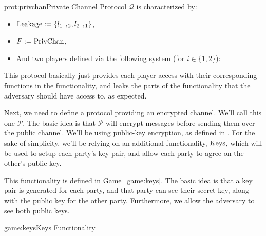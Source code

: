 \begin{protocol}{prot:privchan}{Private Channel Protocol}
    $\mathscr{Q}$ is characterized by:
    \begin{itemize}
        \item $\text{Leakage} := \{l_{1\to 2}, l_{2\to1}\}$,
        \item $F := \text{PrivChan}$,
        \item And two players defined via the following system (for $i \in \{1, 2\}$):
    \end{itemize}

\end{protocol}

This protocol basically just provides each player access with their corresponding
functions in the functionality, and leaks the parts of the functionality
that the adversary should have access to, as expected.

Next, we need to define a protocol providing an encrypted channel.
We'll call this one $\mathscr{P}$.
The basic idea is that $\mathscr{P}$ will encrypt messages before sending
them over the public channel.
We'll be using public-key encryption, as defined in .
For the sake of simplicity, we'll be relying on an additional functionality,
$\text{Keys}$, which will be used to setup each party's key pair, and allow
each party to agree on the other's public key.

This functionality is defined in Game~\ref{game:keys}.
The basic idea is that a key pair is generated for each party,
and that party can see their secret key, along with the public key for the other party.
Furthermore, we allow the adversary to see both public keys.

\begin{game}{game:keys}{Keys Functionality}
\end{game}

